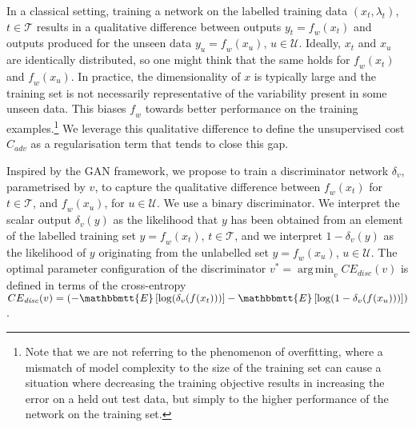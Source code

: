 \documentclass[a4paper]{article}
\DeclareMathOperator*{\argmin}{arg\,min}
\newcommand{\net}{\mathit{f}} %
\newcommand{\disc}{\delta} %
\newcommand{\C}{\mathit{C}}
\newcommand{\TrainingIndexes}{\mathcal{T}}
\newcommand{\UnseenIndexes}{\mathcal{U}}
\newcommand{\expect}[1]{\mathbbmtt{E}\left[#1\right]}
\begin{document}
In a classical setting, training a network on the labelled training data $(x_t,\lambda_t)$, $t\in\TrainingIndexes$ results in a qualitative difference between outputs $y_t=\net_w(x_t)$ and outputs produced for the unseen data $y_u=\net_w(x_u)$, $u \in\UnseenIndexes$. Ideally, $x_t$ and $x_u$ are identically distributed, so one might think that the same holds for $\net_w(x_t)$ and $\net_w(x_u)$.
In practice, the dimensionality of $x$ is typically large and the training set is not necessarily representative of the variability present in some unseen data. This biases $\net_w$ towards better performance on the training examples.\footnote{Note that we are not referring to the phenomenon of overfitting, where a mismatch of model complexity to the size of the training set can cause a situation where decreasing the training objective results in increasing the error on a held out test data, but simply to the higher performance of the network on the training set.} We leverage this qualitative difference to define the unsupervised cost $\C_\mathit{adv}$ as a regularisation term that tends to close this gap.

Inspired by the GAN framework, we propose to train a discriminator network $\disc_v$, parametrised by $v$, to capture the qualitative difference between $\net_w(x_t)$ for $t\in\TrainingIndexes$, and $\net_w(x_u)$, for $u\in\UnseenIndexes$.
We use a binary discriminator. We interpret the scalar output $\disc_v(y)$ as the likelihood that $y$ has been obtained from an element of the labelled training set $y=\net_w(x_t)$, $t\in\TrainingIndexes$, and we interpret $1-\disc_v(y)$ as the likelihood of $y$ originating from the unlabelled set $y=\net_w(x_u)$, $u\in\UnseenIndexes$. The optimal parameter configuration of the discriminator $v^* = \argmin_{v}CE_\mathit{disc}(v)$ is defined in terms of the cross-entropy $CE_\mathit{disc}(v)=\left(-\expect{\log(\disc_v(f(x_t)))} - \expect{\log(1-\disc_v(f(x_u)))}\right)$.
\end{document}
